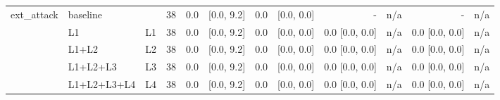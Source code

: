 \begin{tabular}{lllrrrrrrrrr}
\midrule
ext\_attack & baseline &  & 38 & 0.0 & [0.0, 9.2] & 0.0 & [0.0, 0.0] & - & n/a & - & n/a \\
 & L1 & L1 & 38 & 0.0 & [0.0, 9.2] & 0.0 & [0.0, 0.0] & 0.0 [0.0, 0.0] & n/a & 0.0 [0.0, 0.0] & n/a \\
 & L1+L2 & L2 & 38 & 0.0 & [0.0, 9.2] & 0.0 & [0.0, 0.0] & 0.0 [0.0, 0.0] & n/a & 0.0 [0.0, 0.0] & n/a \\
 & L1+L2+L3 & L3 & 38 & 0.0 & [0.0, 9.2] & 0.0 & [0.0, 0.0] & 0.0 [0.0, 0.0] & n/a & 0.0 [0.0, 0.0] & n/a \\
 & L1+L2+L3+L4 & L4 & 38 & 0.0 & [0.0, 9.2] & 0.0 & [0.0, 0.0] & 0.0 [0.0, 0.0] & n/a & 0.0 [0.0, 0.0] & n/a \\
\bottomrule
\end{tabular}
